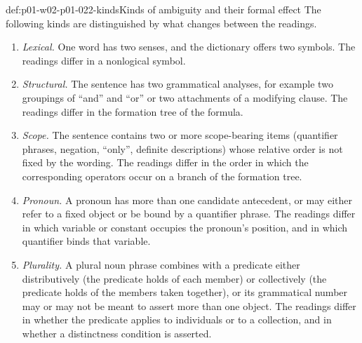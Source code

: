 \begin{hbdefinition}{def:p01-w02-p01-022-kinds}{Kinds of ambiguity and their formal effect}
The following kinds are distinguished by what changes between the readings.
\begin{enumerate}
  \item \emph{Lexical.} One word has two senses, and the dictionary offers
        two symbols. The readings differ in a nonlogical symbol.
  \item \emph{Structural.} The sentence has two grammatical analyses, for
        example two groupings of ``and'' and ``or'' or two attachments of a
        modifying clause. The readings differ in the formation tree of the
        formula.
  \item \emph{Scope.} The sentence contains two or more scope-bearing items
        (quantifier phrases, negation, ``only'', definite descriptions) whose
        relative order is not fixed by the wording. The readings differ in
        the order in which the corresponding operators occur on a branch of
        the formation tree.
  \item \emph{Pronoun.} A pronoun has more than one candidate antecedent, or
        may either refer to a fixed object or be bound by a quantifier
        phrase. The readings differ in which variable or constant occupies
        the pronoun's position, and in which quantifier binds that variable.
  \item \emph{Plurality.} A plural noun phrase combines with a predicate
        either distributively (the predicate holds of each member) or
        collectively (the predicate holds of the members taken together), or
        its grammatical number may or may not be meant to assert more than
        one object. The readings differ in whether the predicate applies to
        individuals or to a collection, and in whether a distinctness
        condition is asserted.
\end{enumerate}
\end{hbdefinition}

